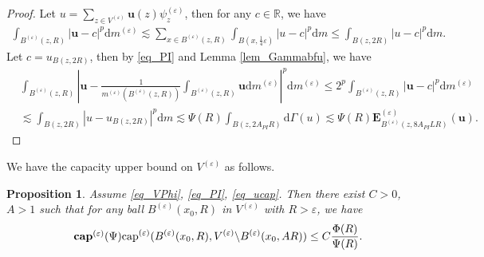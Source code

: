 \documentclass[11pt,a4paper]{article}
\numberwithin{equation}{section}
\theoremstyle{plain}
\newtheorem{proposition}[theorem]{Proposition}
\theoremstyle{definition}
\begin{document}
\begin{proof}
Let $u=\sum_{z\in V^{(\varepsilon)}}\mathbf{u}(z)\psi_z^{(\varepsilon)}$, then for any $c\in \mathbb{R}$, we have
\begin{align*}
\int_{B^{(\varepsilon)}(z,R)}|\mathbf{u}-c|^p\mathrm{d} m^{(\varepsilon)}\lesssim \sum_{x\in B^{(\varepsilon)}(z,R)}\int_{B(x,\frac{1}{4}\varepsilon)}|u-c|^p\mathrm{d} m\le \int_{B(z,2R)}|u-c|^p\mathrm{d} m.
\end{align*}
Let $c=u_{B(z,2R)}$, then by \ref{eq_PI} and Lemma \ref{lem_Gammabfu}, we have
\begin{align*}
&\int_{B^{(\varepsilon)}(z,R)}|\mathbf{u}-\frac{1}{m^{(\varepsilon)}(B^{(\varepsilon)}(z,R))}\int_{B^{(\varepsilon)}(z,R)}\mathbf{u}\mathrm{d} m^{(\varepsilon)}|^p\mathrm{d} m^{(\varepsilon)}\le2^p\int_{B^{(\varepsilon)}(z,R)}|\mathbf{u}-c|^p\mathrm{d} m^{(\varepsilon)}\\
&\lesssim \int_{B(z,2R)}|u-u_{B(z,2R)}|^p\mathrm{d} m\lesssim \Psi(R)\int_{B(z,2A_{PI}R)}\mathrm{d}\Gamma(u)\lesssim \Psi(R)\mathbf{E}^{(\varepsilon)}_{B^{(\varepsilon)}(z,8A_{PI}LR)}(\mathbf{u}).
\end{align*}
\end{proof}

We have the capacity upper bound on $V^{(\varepsilon)}$ as follows.

\begin{proposition}\label{prop_ucap_Veps}
Assume \ref{eq_VPhi}, \ref{eq_PI}, \ref{eq_ucap}. Then there exist $C>0$, $A>1$ such that for any ball $B^{(\varepsilon)}(x_0,R)$ in $V^{(\varepsilon)}$ with $R>\varepsilon$, we have
\begin{equation*}\label{eq_ucap_Veps}\tag*{$\mathbf{cap}^{(\varepsilon)}(\Psi)$}
\mathrm{cap}^{(\varepsilon)}(B^{(\varepsilon)}(x_0,R),V^{(\varepsilon)}\backslash B^{(\varepsilon)}(x_0,AR))\le C \frac{\Phi(R)}{\Psi(R)}.
\end{equation*}
\end{proposition}
\end{document}
